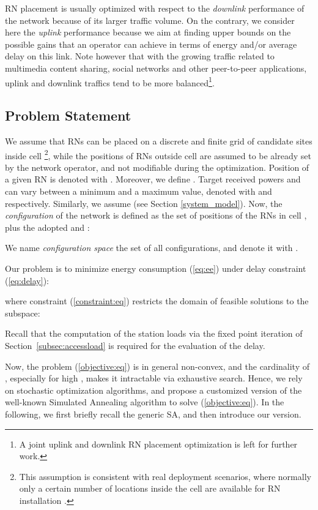 \documentclass[draftcls,onecolumn]{IEEEtran}
\theoremstyle{plain}
\theoremstyle{definition}
\begin{document}
RN placement is usually optimized with respect to the {\it downlink} performance of the network because of its larger traffic volume. On the contrary, we consider here the {\it uplink} performance because we aim at finding upper bounds on the possible gains that an operator can achieve in terms of energy and/or average delay on this link. Note however that with the growing traffic related to multimedia content sharing, social networks and other peer-to-peer applications, uplink and downlink traffics tend to be more balanced\footnote{A joint uplink and downlink RN placement optimization is left for further work.}. 
  
\subsection{Problem Statement}
We assume that RNs can be placed on a discrete and finite grid of candidate sites inside cell \footnote{This assumption is consistent with real deployment scenarios, where normally only a certain number of locations inside the cell are available for RN installation \cite{bulakciRSP}.}, while the positions of RNs outside cell  are assumed to be already set by the network operator, and not modifiable during the optimization. Position of a given RN  is denoted with . 
Moreover, we define .
Target received powers  and  can vary between a minimum and a maximum value, denoted with  and  respectively. Similarly, we assume  (see Section \ref{system_model}).
Now, the {\it configuration}  of the network is defined as the set of positions of the  RNs in cell , plus the adopted  and :

We name {\it configuration space} the set of all configurations, and denote it with .

Our problem is to minimize energy consumption (\ref{eq:ee}) under delay constraint (\ref{eq:delay}):


where constraint (\ref{constraint:eq}) restricts the domain of feasible solutions to the subspace: 

Recall that the computation of the station loads via the fixed point iteration of Section~\ref{subsec:accessload} is required for the evaluation of the delay.

Now, the problem (\ref{objective:eq}) is in general non-convex, and the cardinality of , especially for high , makes it intractable via exhaustive search. Hence, we rely on stochastic optimization algorithms, and propose a customized version of the well-known Simulated Annealing algorithm to solve (\ref{objective:eq}). In the following, we first briefly recall the generic SA, and then introduce our version.
\end{document}
